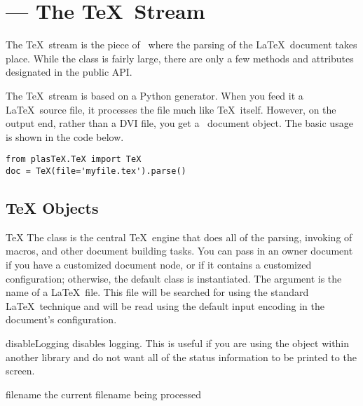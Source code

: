 
\section{ --- The \TeX\ Stream}


The \TeX\ stream is the piece of \plasTeX\ where the parsing of the
\LaTeX\ document takes place.  While the  class is fairly
large, there are only a few methods and attributes designated in the
public API.  

The \TeX\ stream is based on a Python generator.  When you feed it
a \LaTeX\ source file, it processes the file much like \TeX\ itself.
However, on the output end, rather than a DVI file, you get a 
\plasTeX\ document object.  The basic usage is shown in the code below.
\begin{verbatim}
from plasTeX.TeX import TeX
doc = TeX(file='myfile.tex').parse()
\end{verbatim}

\subsection{TeX Objects}

\begin{classdesc}{TeX}{}
The  class is the central \TeX\ engine that does all of the 
parsing, invoking of macros, and other document building tasks.
You can pass in an owner document if you have a customized document
node, or if it contains a customized configuration; otherwise, 
the default  class is instantiated.  The 
argument is the name of a \LaTeX\ file.  This file will be 
searched for using the standard \LaTeX\ technique and will be 
read using the default input encoding in the document's configuration.
\end{classdesc}

\begin{methoddesc}[TeX]{disableLogging}{}
disables logging.  This is useful if you are using the  object
within another library and do not want all of the status information to 
be printed to the screen.

\end{methoddesc}

\begin{memberdesc}[TeX]{filename}
the current filename being processed
\end{memberdesc}

